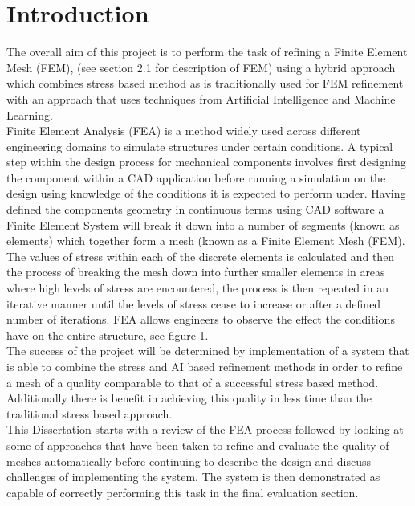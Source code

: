 \section{Introduction}

The overall aim of this project is to perform the task of refining a Finite Element Mesh (FEM), (see section 2.1 for description of FEM) using a hybrid approach which combines stress based method as is traditionally used for FEM refinement with an approach that uses techniques from Artificial Intelligence and Machine Learning. \\

\noindent
Finite Element Analysis (FEA) is a method widely used across different engineering domains to simulate structures under certain conditions. A typical step within the design process for mechanical components involves first designing the component within a CAD application before running a simulation on the design using knowledge of the conditions it is expected to perform under. Having defined the components geometry in continuous terms using CAD software a Finite Element System will break it down into a number of segments (known as elements) which together form a mesh (known as a Finite Element Mesh (FEM). The values of stress within  each of the discrete elements is calculated and then the process of breaking the mesh down into further smaller elements in areas where high levels of stress are encountered, the process is then repeated in an iterative manner until the levels of stress cease to increase or after a defined number of iterations. FEA allows engineers to observe the effect the conditions have on the entire structure, see figure 1. \\ 

\noindent
The success of the project will be determined by implementation of a system that is able to combine the stress and AI based refinement methods in order to refine a mesh of a quality comparable to that of a successful stress based method. Additionally there is benefit in  achieving this quality in less time than the traditional stress based approach. \\ 

\noindent
This Dissertation starts with a review of the FEA process followed by looking at some of approaches that have been taken to refine and evaluate the quality of meshes automatically before continuing to describe the design and discuss challenges of implementing the system. The system is then demonstrated as capable of correctly performing this task in the final evaluation section. \\

